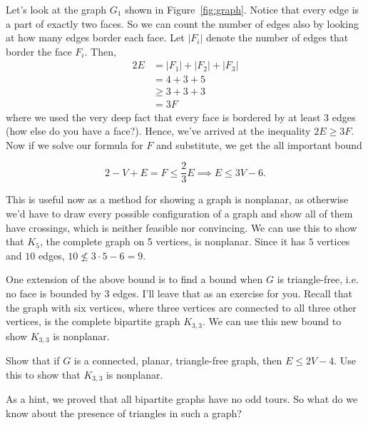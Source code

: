 \documentclass[11 pt]{scrartcl}
\begin{document}
Let's look at the graph $G_1$ shown in Figure~\ref{fig:graph}. Notice that every edge is a part of exactly two faces. So we can count the number of edges also by looking at how many edges border each face. Let $|F_i|$ denote the number of edges that border the face $F_i$. Then, 
\begin{align*}
    2E &= |F_1| + |F_2| + |F_3| \\ 
       &= 4 + 3 + 5 \\ 
       &\geq 3 + 3 + 3 \\ 
       &= 3F
\end{align*}
where we used the very deep fact that every face is bordered by at least 3 edges (how else do you have a face?). Hence, we've arrived at the inequality $2E \geq 3F$. Now if we solve our formula for $F$ and substitute, we get the all important bound

\[ 2 - V + E = F \leq \frac{2}{3} E \implies \boxed{E \leq 3V-6}.\] 

This is useful now as a method for showing a graph is nonplanar, as otherwise we'd have to draw every possible configuration of a graph and show all of them have crossings, which is neither feasible nor convincing. We can use this to show that $K_5$, the complete graph on 5 vertices, is nonplanar. Since it has $5$ vertices and $10$ edges, $10 \not\leq 3\cdot 5 - 6 = 9$. 

One extension of the above bound is to find a bound when $G$ is triangle-free, i.e. no face is bounded by 3 edges. I'll leave that as an exercise for you. Recall that the graph with six vertices, where three vertices are connected to all three other vertices, is the complete bipartite graph $K_{3,3}$. We can use this new bound to show $K_{3,3}$ is nonplanar.


\begin{exercise}
    Show that if $G$ is a connected, planar, triangle-free graph, then $E \leq 2V - 4$. Use this to show that $K_{3,3}$ is nonplanar. 
\end{exercise}

As a hint, we proved that all bipartite graphs have no odd tours. So what do we know about the presence of triangles in such a graph? 
\end{document}
